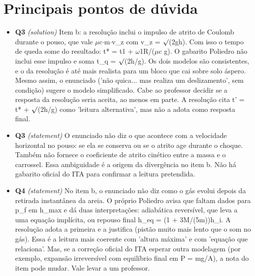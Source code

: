\documentclass{article}%
\begin{document}
\section*{Principais pontos de dúvida}%
\begin{itemize}%
\item%
\textbf{Q3} \textit{(solution)} Item b: a resolução inclui o impulso de atrito de Coulomb durante o pouso, que vale $\mu$c$\cdot$m$\cdot$v\_z com v\_z = $\surd$(2gh). Com isso o tempo de queda some do resultado: t* = t1 + $\omega$1R/($\mu$c g). O gabarito Poliedro não inclui esse impulso e soma t\_q = $\surd$(2h/g). Os dois modelos são consistentes, e o da resolução é até mais realista para um bloco que cai sobre solo áspero. Mesmo assim, o enunciado ('não quica... mas realiza um deslizamento', sem condição) sugere o modelo simplificado. Cabe ao professor decidir se a resposta da resolução seria aceita, ao menos em parte. A resolução cita t' = t* + $\surd$(2h/g) como 'leitura alternativa', mas não a adota como resposta final.%
\item%
\textbf{Q3} \textit{(statement)} O enunciado não diz o que acontece com a velocidade horizontal no pouso: se ela se conserva ou se o atrito age durante o choque. Também não fornece o coeficiente de atrito cinético entre a massa e o carrossel. Essa ambiguidade é a origem da divergência no item b. Não há gabarito oficial do ITA para confirmar a leitura pretendida.%
\item%
\textbf{Q4} \textit{(statement)} No item b, o enunciado não diz como o gás evolui depois da retirada instantânea da areia. O próprio Poliedro avisa que faltam dados para p\_f em h\_max e dá duas interpretações: adiabática reversível, que leva a uma equação implícita, ou repouso final h\_eq = (1 + 3M/(5m))h\_i. A resolução adota a primeira e a justifica (pistão muito mais lento que o som no gás). Essa é a leitura mais coerente com 'altura máxima' e com 'equação que relaciona'. Mas, se a correção oficial do ITA esperar outra modelagem (por exemplo, expansão irreversível com equilíbrio final em P = mg/A), a nota do item pode mudar. Vale levar a um professor.%
\end{itemize}%
\end{document}
